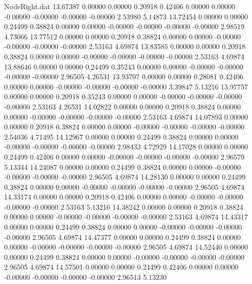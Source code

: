 \begin{filecontents}{NodeRight.dat}
  13.67387    0.00000    0.00000     0.20918    0.42406    0.00000    0.00000   -0.00000   -0.00000   -0.00000   -0.00000    2.53980    5.14873
  13.72454    0.00000    0.00000     0.24499    0.38824    0.00000    0.00000   -0.00000   -0.00000   -0.00000   -0.00000    2.98519    4.73066
  13.77512    0.00000    0.00000     0.20918    0.38824    0.00000    0.00000   -0.00000   -0.00000   -0.00000   -0.00000    2.53163    4.69874
  13.83585    0.00000    0.00000     0.20918    0.38824    0.00000    0.00000   -0.00000   -0.00000   -0.00000   -0.00000    2.53163    4.69874
  13.88646    0.00000    0.00000     0.24499    0.35243    0.00000    0.00000   -0.00000   -0.00000   -0.00000   -0.00000    2.96505    4.26531
  13.93707    0.00000    0.00000     0.28081    0.42406    0.00000    0.00000   -0.00000   -0.00000   -0.00000   -0.00000    3.39847    5.13216
  13.97757    0.00000    0.00000     0.20918    0.35243    0.00000    0.00000   -0.00000   -0.00000   -0.00000   -0.00000    2.53163    4.26531
  14.02822    0.00000    0.00000     0.20918    0.38824    0.00000    0.00000   -0.00000   -0.00000   -0.00000   -0.00000    2.53163    4.69874
  14.07893    0.00000    0.00000     0.20918    0.38824    0.00000    0.00000   -0.00000   -0.00000   -0.00000   -0.00000    2.54036    4.71495
  14.12967    0.00000    0.00000     0.24499    0.38824    0.00000    0.00000   -0.00000   -0.00000   -0.00000   -0.00000    2.98433    4.72929
  14.17028    0.00000    0.00000     0.24499    0.42406    0.00000    0.00000   -0.00000   -0.00000   -0.00000   -0.00000    2.96579    5.13344
  14.24087    0.00000    0.00000     0.24499    0.38824    0.00000    0.00000   -0.00000   -0.00000   -0.00000   -0.00000    2.96505    4.69874
  14.28130    0.00000    0.00000     0.24499    0.38824    0.00000    0.00000   -0.00000   -0.00000   -0.00000   -0.00000    2.96505    4.69874
  14.33174    0.00000    0.00000     0.20918    0.42406    0.00000    0.00000   -0.00000   -0.00000   -0.00000   -0.00000    2.53163    5.13216
  14.38242    0.00000    0.00000     0.20918    0.38824    0.00000    0.00000   -0.00000   -0.00000   -0.00000   -0.00000    2.53163    4.69874
  14.43317    0.00000    0.00000     0.24499    0.38824    0.00000    0.00000   -0.00000   -0.00000   -0.00000   -0.00000    2.96505    4.69874
  14.47377    0.00000    0.00000     0.24499    0.38824    0.00000    0.00000   -0.00000   -0.00000   -0.00000   -0.00000    2.96505    4.69874
  14.52440    0.00000    0.00000     0.24499    0.38824    0.00000    0.00000   -0.00000   -0.00000   -0.00000   -0.00000    2.96505    4.69874
  14.57501    0.00000    0.00000     0.24499    0.42406    0.00000    0.00000   -0.00000   -0.00000   -0.00000   -0.00000    2.96513    5.13230

\end{filecontents}
